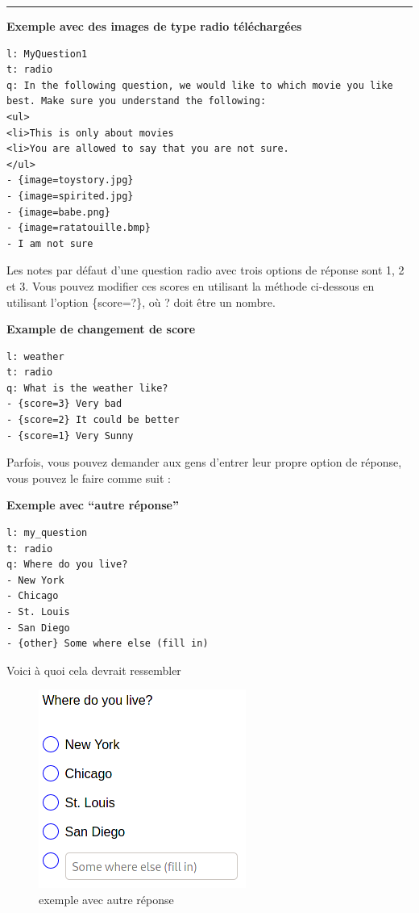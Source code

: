 \documentclass[
]{book}
\begin{document}
\begin{center}\rule{0.5\linewidth}{0.5pt}\end{center}

\textbf{Exemple avec des images de type radio téléchargées}

\begin{verbatim}
l: MyQuestion1
t: radio
q: In the following question, we would like to which movie you like
best. Make sure you understand the following:
<ul>
<li>This is only about movies
<li>You are allowed to say that you are not sure.
</ul>
- {image=toystory.jpg}
- {image=spirited.jpg}
- {image=babe.png}
- {image=ratatouille.bmp}
- I am not sure
\end{verbatim}

Les notes par défaut d'une question radio avec trois options de réponse sont 1, 2 et 3. Vous pouvez modifier ces scores en utilisant la méthode ci-dessous en utilisant l'option \{score=?\}, où ? doit être un nombre.

\textbf{Example de changement de score}

\begin{verbatim}
l: weather
t: radio
q: What is the weather like?
- {score=3} Very bad
- {score=2} It could be better
- {score=1} Very Sunny
\end{verbatim}

Parfois, vous pouvez demander aux gens d'entrer leur propre option de réponse, vous pouvez le faire comme suit :

\textbf{Exemple avec ``autre réponse''}

\begin{verbatim}
l: my_question
t: radio
q: Where do you live?
- New York
- Chicago
- St. Louis
- San Diego
- {other} Some where else (fill in)
\end{verbatim}

Voici à quoi cela devrait ressembler

\begin{figure}
\centering
\includegraphics{img/radio_other.png}
\caption{exemple avec autre réponse}
\end{figure}
\end{document}

